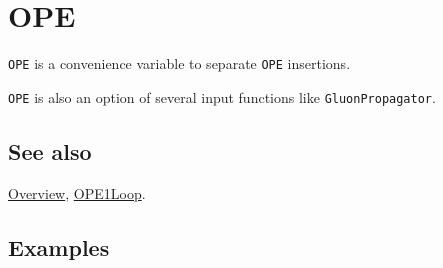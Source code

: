 \documentclass[../FeynCalcManual.tex]{subfiles}
\begin{document}
\hypertarget{ope}{%
\section{OPE}\label{ope}}

\texttt{OPE} is a convenience variable to separate \texttt{OPE}
insertions.

\texttt{OPE} is also an option of several input functions like
\texttt{GluonPropagator}.

\subsection{See also}

\hyperlink{toc}{Overview}, \hyperlink{ope1loop}{OPE1Loop}.

\subsection{Examples}
\end{document}
